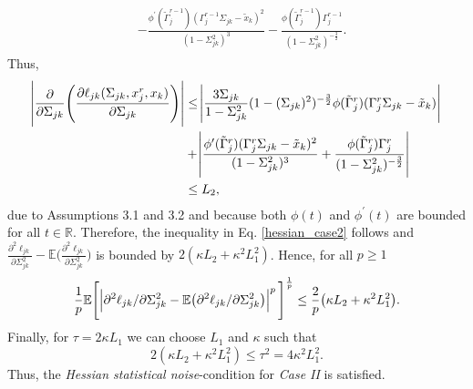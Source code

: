 \begin{condition}
\begin{multline}
\begin{aligned}
             & -  \frac{\phi^\prime({\tilde{\Gamma}}_j^{r-1})({\Gamma}_j^{r-1}\Sigma_{jk} - {\tilde{x}}_{k})^2}{(1-\Sigma_{jk}^2)^3} - \frac{\phi({\tilde{\Gamma}}_j^{r-1}){\Gamma}_j^{r-1}}{(1-\Sigma_{jk}^2)^{-\frac{3}{2}}}.
        \end{aligned}
    \end{multline}
    Thus,
    \begin{align*}
        \abs{\frac{\partial}{\partial \Sigma_{jk}} \Bigg(\frac{\partial\ell_{jk}(\Sigma_{jk}, x_j^r,x_k)}{\partial \Sigma_{jk}}\Bigg)}
         & \leq \abs{\frac{3\Sigma_{jk}}{1-\Sigma_{jk}^2} (1-(\Sigma_{jk})^2)^{-\frac{3}{2}} \phi({\tilde{\Gamma}}_j^{r})({\Gamma}_j^r\Sigma_{jk} - {\tilde{x}}_{k})}                                                 \\
         & + \abs{\frac{\phi^\prime({\tilde{\Gamma}}_j^{r})({\Gamma}_j^r\Sigma_{jk} - {\tilde{x}}_{k})^2}{(1-\Sigma_{jk}^2)^3} + \frac{\phi({\tilde{\Gamma}}_j^{r}){\Gamma}_j^{r}}{(1-\Sigma_{jk}^2)^{-\frac{3}{2}}}} \\
         & \leq L_2,
    \end{align*}
    due to Assumptions 3.1 and 3.2 %
    and because both $\phi(t)$ and $\phi^{\prime}(t)$ are bounded for all $t\in\mathbb{R}$. Therefore, the inequality in Eq. \eqref{hessian_case2} follows and $\frac{\partial^2\ell_{jk}}{\partial \Sigma_{jk}^{2}} - \mathbb{E}\bigg(\frac{\partial^2\ell_{jk}}{\partial \Sigma_{jk}^{2}}\bigg)$ is bounded by $2(\kappa L_2 + \kappa^2 L_1^2)$. Hence, for all $p\geq1$
    \begin{equation}
        \frac{1}{p}\mathbb{E}\Bigg[\abs{\partial^2\ell_{jk}/\partial \Sigma_{jk}^{2} - \mathbb{E}\big(\partial^2\ell_{jk}/\partial \Sigma_{jk}^{2}\big)}^p\Bigg]^{\frac{1}{p}} \leq \frac{2}{p}\big(\kappa L_2 + \kappa^2 L_1^2\big).
    \end{equation}
    Finally, for $\tau = 2\kappa L_1$ we can choose $L_1$ and $\kappa$ such that \[2(\kappa L_2 + \kappa^2 L_1^2) \leq \tau^2 = 4\kappa^2 L_1^2.\] Thus, the \textit{Hessian statistical noise}-condition for \textit{Case II} is satisfied.


\end{condition}
